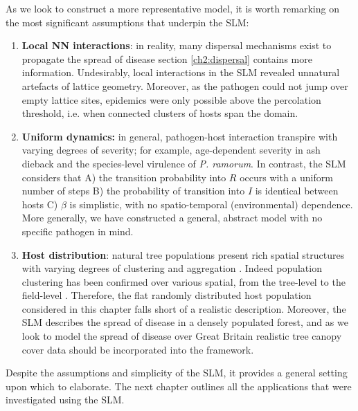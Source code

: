As we look to construct a more representative model, it is worth remarking on the most significant assumptions that underpin the SLM:
\begin{enumerate}
    \item \textbf{Local NN interactions}: in reality, many dispersal mechanisms exist to propagate the spread of disease\textemdash 
    section \ref{ch2:dispersal} contains more information. 
    Undesirably, local interactions in the SLM revealed unnatural artefacts of lattice geometry.
    Moreover, as the pathogen could not jump over empty lattice sites, epidemics were only possible above the percolation threshold, 
    i.e. when connected clusters of hosts span the domain.  
    
    \item \textbf{Uniform dynamics:} in general, pathogen-host interaction transpire with varying degrees of severity; 
    for example, age-dependent severity in ash dieback and the species-level virulence of 
    \textit{P. ramorum}. 
    In contrast, the SLM considers that A) the transition probability into $R$ occurs with a uniform number of steps 
    B) the probability of transition into $I$ is identical between hosts 
    C) $\beta$ is simplistic, with no spatio-temporal (environmental) dependence. 
    More generally, we have constructed a general, abstract model with no specific pathogen in mind.
    
    \item \textbf{Host distribution}: natural tree populations present rich spatial structures with varying degrees of clustering and aggregation \cite{doi:10.1086/342823}.
    Indeed population clustering has been confirmed over various spatial, from the tree-level to the field-level \cite{wiegand2007analyzing}.
    Therefore, the flat randomly distributed host population considered in this chapter falls short of a realistic description.
    Moreover, the SLM describes the spread of disease in a densely populated forest, and as we look to model the spread of disease over Great Britain realistic tree canopy cover data should be incorporated into the framework.
\end{enumerate}
Despite the assumptions and simplicity of the SLM, it provides a general setting upon which to elaborate.
The next chapter outlines all the applications that were investigated using the SLM.
\newpage